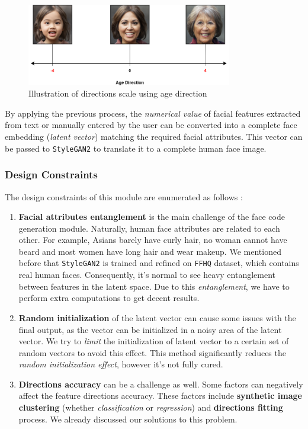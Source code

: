 \begin{figure}[H]
    \centering
    \includegraphics[width=0.8\textwidth]{images/dir-scale.png}
    \caption{Illustration of directions scale using age direction}
    \label{fig:dir_scale}
\end{figure}

By applying the previous process, the \emph{numerical value} of facial features extracted from text or manually entered by the user can be converted into a complete face embedding (\emph{latent vector}) matching the required facial attributes. This vector can be passed to \texttt{StyleGAN2} to translate it to a complete human face image.

\subsubsection{Design Constraints}

The design constraints of this module are enumerated as follows :
\begin{enumerate}
    \item \textbf{Facial attributes entanglement} is the main challenge of the face code generation module. Naturally, human face attributes are related to each other. For example, Asians barely have curly hair, no woman cannot have beard and most women have long hair and wear makeup. We mentioned before that \texttt{StyleGAN2} is trained and refined on \texttt{FFHQ} dataset, which contains real human faces. Consequently, it's normal to see heavy entanglement between features in the latent space. Due to this \emph{entanglement}, we have to perform extra computations to get decent results.
    \item \textbf{Random initialization} of the latent vector can cause some issues with the final output, as the vector can be initialized in a noisy area of the latent vector. We try to \emph{limit} the initialization of latent vector to a certain set of random vectors to avoid this effect. This method significantly reduces the \emph{random initialization effect}, however it's not fully cured.
    \item \textbf{Directions accuracy} can be a challenge as well. Some factors can negatively affect the feature directions accuracy. These factors include \textbf{synthetic image clustering} (whether \emph{classification} or \emph{regression}) and \textbf{directions fitting} process. We already discussed our solutions to this problem.
\end{enumerate}

